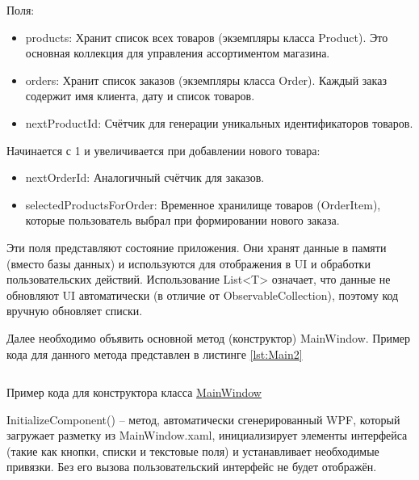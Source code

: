 \documentclass[12pt]{article}
\newcommand{\colorGIT}[1]{\textcolor{CtpLavender}{#1}}
\renewcommand{\texttt}[1]{{\small\ttfamily #1}}
\numberwithin{listing}{section}
\numberwithin{figure}{section}
\begin{document}
\noindent Поля:
\begin{itemize}
	\item \texttt{products}: Хранит список всех товаров (экземпляры класса \texttt{Product}). Это основная коллекция для управления ассортиментом магазина.
	\item \texttt{orders}: Хранит список заказов (экземпляры класса \texttt{Order}). Каждый заказ содержит имя клиента, дату и список товаров.
	\item \texttt{nextProductId}: Счётчик для генерации уникальных идентификаторов товаров.
\end{itemize}

\noindent Начинается с 1 и увеличивается при добавлении нового товара:
\begin{itemize}
	\item \texttt{nextOrderId}: Аналогичный счётчик для заказов.
	\item \texttt{selectedProductsForOrder}: Временное хранилище товаров (\texttt{OrderItem}), которые пользователь выбрал при формировании нового заказа.
\end{itemize}

Эти поля представляют состояние приложения. Они хранят данные в памяти (вместо базы данных) и используются для отображения в \texttt{UI} и обработки пользовательских действий. Использование \texttt{List<T>} означает, что данные не обновляют \texttt{UI} автоматически (в отличие от \texttt{Observable\-Collection}), поэтому код вручную обновляет списки.

{}
Далее необходимо объявить основной метод (конструктор) \texttt{MainWindow}.
Пример кода для данного метода представлен в листинге \ref{lst:Main2}

\begin{listing}[H]
	\inputminted[firstline=24, lastline=30]{csharp}{../../3lab/StoreManager/MainWindow.xaml.cs}
	\caption{Пример кода для конструктора класса \colorGIT{\href{https://github.com/WebMasterIT/Csharp_Labs/blob/ec375afd16c0647b337cf3d8a79c8bef904fc1be/3lab/StoreManager/MainWindow.xaml.cs\#L24-L30}{MainWindow}}}
	\label{lst:Main2}
\end{listing}

\texttt{InitializeComponent()} -- метод, автоматически сгенерированный \texttt{WPF}, который загружает разметку из \texttt{MainWindow.xaml}, инициализирует элементы интерфейса (такие как кнопки, списки и текстовые поля) и устанавливает необходимые привязки. Без его вызова пользовательский интерфейс не будет отображён.
\end{document}
